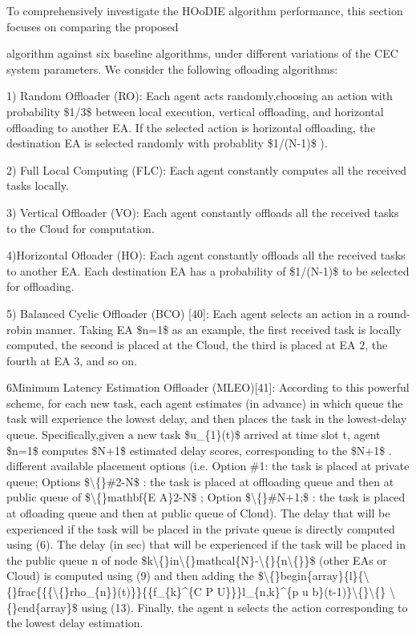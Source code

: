 \documentclass{article}
\begin{document}
To comprehensively investigate the HOoDIE algorithm performance, this section focuses on comparing the proposed

algorithm against six baseline algorithms, under different variations of the CEC system parameters. We consider the following ofloading algorithms:

1) Random Offloader (RO): Each agent acts randomly,choosing an action with probability \$1/3\$ between local execution, vertical offloading, and horizontal offloading to another EA. If the selected action is horizontal offloading, the destination EA is selected randomly with probablity \$1/(N-1)\$ ).

2) Full Local Computing (FLC): Each agent constantly computes all the received tasks locally.

3) Vertical Offloader (VO): Each agent constantly offloads all the received tasks to the Cloud for computation.

4)Horizontal Ofloader (HO): Each agent constantly offloads all the received tasks to another EA. Each destination EA has a probability of \$1/(N-1)\$ to be selected for offloading.

5) Balanced Cyclic Offloader (BCO) [40]: Each agent selects an action in a round-robin manner. Taking EA \$n=1\$ as an example, the first received task is locally computed, the second is placed at the Cloud, the third is placed at EA 2, the fourth at EA 3, and so on.

6Minimum Latency Estimation Offloader (MLEO)[41]: According to this powerful scheme, for each new task, each agent estimates (in advance) in which queue the task will experience the lowest delay, and then places the task in the lowest-delay queue. Specifically,given a new task \$u\_\{1\}(t)\$ arrived at time slot t, agent \$n=1\$ computes \$N+1\$ estimated delay scores, corresponding to the \$N+1\$ . different available placement options (i.e. Option \#1: the task is placed at private queue; Options \$\textbackslash\{\}\#2-N\$ : the task is placed at offloading queue and then at public queue of \$\textbackslash\{\}mathbf\{E A\}2-N\$ ; Option \$\textbackslash\{\}\#N+1;\$ : the task is placed at ofloading queue and then at public queue of Cloud). The delay that will be experienced if the task will be placed in the private queue is directly computed using (6). The delay (in sec) that will be experienced if the task will be placed in the public queue n of node \$k\textbackslash\{\}in\textbackslash\{\}mathcal\{N\}-\textbackslash\{\}\{n\textbackslash\{\}\}\$ (other EAs or Cloud) is computed using (9) and then adding the \$\textbackslash\{\}begin\{array\}\{l\}\{\textbackslash\{\}frac\{\{\{\textbackslash\{\}rho\_\{n\}\}(t)\}\}\{\{f\_\{k\}\textasciicircum{}\{C P U\}\}\}l\_\{n,k\}\textasciicircum{}\{p u b\}(t-1)\}\textbackslash\{\}\textbackslash\{\} \textbackslash\{\}end\{array\}\$ using (13). Finally, the agent n selects the action corresponding to the lowest delay estimation.
\end{document}
